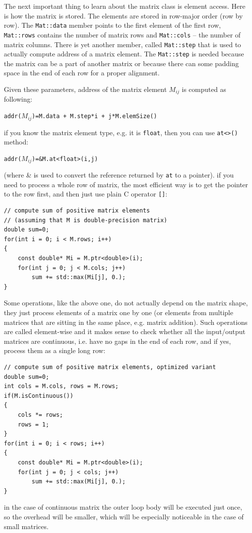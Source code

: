 The next important thing to learn about the matrix class is element access. Here is how the matrix is stored. The elements are stored in row-major order (row by row). The \texttt{Mat::data} member points to the first element of the first row, \texttt{Mat::rows} contains the number of matrix rows and \texttt{Mat::cols} -- the number of matrix columns. There is yet another member, called \texttt{Mat::step} that is used to actually compute address of a matrix element. The \texttt{Mat::step} is needed because the matrix can be a part of another matrix or because there can some padding space in the end of each row for a proper alignment.

Given these parameters, address of the matrix element $M_{ij}$ is computed as following:


\texttt{addr($M_{ij}$)=M.data + M.step*i + j*M.elemSize()}


if you know the matrix element type, e.g. it is \texttt{float}, then you can use \texttt{at<>()} method:


\texttt{addr($M_{ij}$)=\&M.at<float>(i,j)}

(where \& is used to convert the reference returned by \texttt{at} to a pointer).
if you need to process a whole row of matrix, the most efficient way is to get the pointer to the row first, and then just use plain C operator \texttt{[]}:

\begin{lstlisting}
// compute sum of positive matrix elements
// (assuming that M is double-precision matrix)
double sum=0;
for(int i = 0; i < M.rows; i++)
{
    const double* Mi = M.ptr<double>(i);
    for(int j = 0; j < M.cols; j++)
        sum += std::max(Mi[j], 0.);
}
\end{lstlisting}

Some operations, like the above one, do not actually depend on the matrix shape, they just process elements of a matrix one by one (or elements from multiple matrices that are sitting in the same place, e.g. matrix addition). Such operations are called element-wise and it makes sense to check whether all the input/output matrices are continuous, i.e. have no gaps in the end of each row, and if yes, process them as a single long row:

\begin{lstlisting}
// compute sum of positive matrix elements, optimized variant
double sum=0;
int cols = M.cols, rows = M.rows;
if(M.isContinuous())
{
    cols *= rows;
    rows = 1;
}
for(int i = 0; i < rows; i++)
{
    const double* Mi = M.ptr<double>(i);
    for(int j = 0; j < cols; j++)
        sum += std::max(Mi[j], 0.);
}
\end{lstlisting}
in the case of continuous matrix the outer loop body will be executed just once, so the overhead will be smaller, which will be especially noticeable in the case of small matrices.

